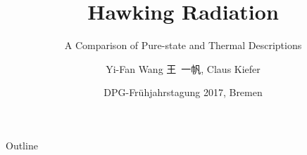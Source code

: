 \documentclass{beamer}
\title%
{Hawking Radiation}
\subtitle{A Comparison of Pure-state and Thermal Descriptions}
\author[Wang] %
{Yi-Fan Wang 王\ 一帆, Claus Kiefer}
\institute[Uni zu Köln] %
{
  Institut für Theoretische Physik \\
  Universität zu Köln}
\date[Bremen17] %
{DPG-Frühjahrstagung 2017, Bremen}
\begin{document}
\begin{frame}
  \titlepage
\end{frame}

\begin{frame}{Outline}
  \tableofcontents
\end{frame}









\end{document}
